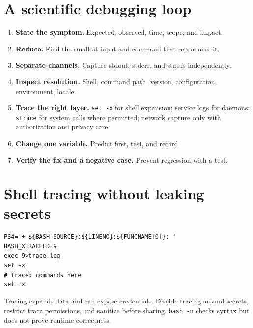 \documentclass[11pt,oneside,openany]{book}
\begin{document}
\section{A scientific debugging loop}
\begin{enumerate}
  \item \textbf{State the symptom.} Expected, observed, time, scope, and impact.
  \item \textbf{Reduce.} Find the smallest input and command that reproduces it.
  \item \textbf{Separate channels.} Capture stdout, stderr, and status independently.
  \item \textbf{Inspect resolution.} Shell, command path, version, configuration, environment, locale.
  \item \textbf{Trace the right layer.} \texttt{set -x} for shell expansion; service logs for daemons; \texttt{strace} for system calls where permitted; network capture only with authorization and privacy care.
  \item \textbf{Change one variable.} Predict first, test, and record.
  \item \textbf{Verify the fix and a negative case.} Prevent regression with a test.
\end{enumerate}

\section{Shell tracing without leaking secrets}
\begin{lstlisting}
PS4='+ ${BASH_SOURCE}:${LINENO}:${FUNCNAME[0]}: '
BASH_XTRACEFD=9
exec 9>trace.log
set -x
# traced commands here
set +x
\end{lstlisting}
Tracing expands data and can expose credentials. Disable tracing around secrets, restrict trace permissions, and sanitize before sharing. \texttt{bash -n} checks syntax but does not prove runtime correctness.
\end{document}
